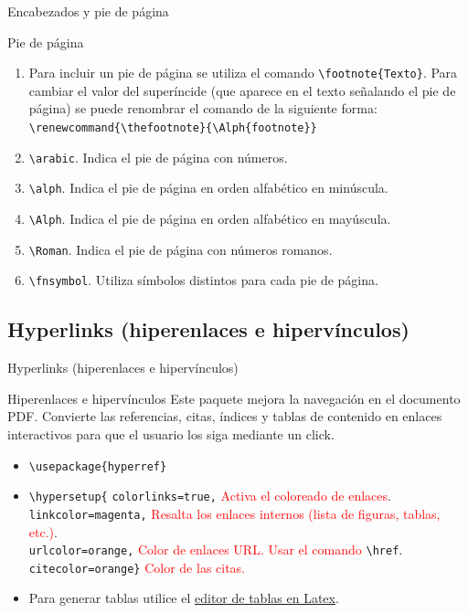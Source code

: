 \documentclass[aspectratio=169, 10pt]{beamer}
\begin{document}
\begin{frame}[fragile]{Encabezados y pie de página}

\begin{block}{Pie de página}
\begin{enumerate}
    \item Para incluir un pie de página se utiliza el comando \verb|\footnote{Texto}|. Para cambiar el valor del superíncide (que aparece en el texto señalando el pie de página) se puede renombrar el comando de la siguiente forma: \verb|\renewcommand{\thefootnote}{\Alph{footnote}}|
    \item \verb|\arabic|. Indica el pie de página con números.
    \item \verb|\alph|. Indica el pie de página en orden alfabético en minúscula.
    \item \verb|\Alph|. Indica el pie de página en orden alfabético en mayúscula.
    \item \verb|\Roman|. Indica el pie de página con números romanos.
    \item \verb|\fnsymbol|. Utiliza símbolos distintos para cada pie de página.
\end{enumerate}
    
\end{block}
\end{frame}



\subsection{Hyperlinks (hiperenlaces e hipervínculos)}
\begin{frame}[fragile]{Hyperlinks (hiperenlaces e hipervínculos)}

\begin{block}{Hiperenlaces e hipervínculos}
Este paquete mejora la navegación en el documento PDF. Convierte las referencias, citas, índices y tablas de contenido en enlaces interactivos para que el usuario los siga mediante un click. 
    \begin{itemize}
    \item \verb|\usepackage{hyperref}|
    \item \verb|\hypersetup{|
            \verb|colorlinks=true,| \textcolor{red}{Activa el coloreado de enlaces}.\\ 
            \verb|linkcolor=magenta,| \textcolor{red}{Resalta los enlaces internos (lista de figuras, tablas, etc.)}. \\ 
            \verb|urlcolor=orange,| \textcolor{red}{Color de enlaces URL. Usar el comando} \verb|\href|. \\
            \verb|citecolor=orange}| \textcolor{red}{Color de las citas.}
        \item Para generar tablas utilice el \href{https://www.tablesgenerator.com/}{editor de tablas en Latex}. 
    \end{itemize}
\end{block}

\end{frame}
\end{document}
